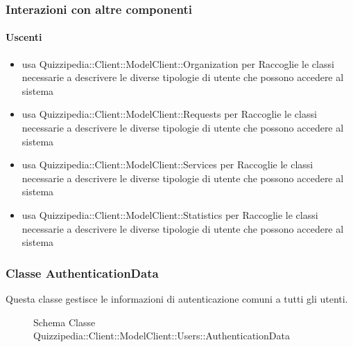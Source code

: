 \subsubsection{Interazioni con altre componenti}
\paragraph{Uscenti}
\begin{itemize}
\item usa Quizzipedia::Client::ModelClient::Organization per Raccoglie le classi necessarie a descrivere le diverse tipologie di utente che possono accedere al sistema
\item usa Quizzipedia::Client::ModelClient::Requests per Raccoglie le classi necessarie a descrivere le diverse tipologie di utente che possono accedere al sistema
\item usa Quizzipedia::Client::ModelClient::Services per Raccoglie le classi necessarie a descrivere le diverse tipologie di utente che possono accedere al sistema
\item usa Quizzipedia::Client::ModelClient::Statistics per Raccoglie le classi necessarie a descrivere le diverse tipologie di utente che possono accedere al sistema
\end{itemize}
\subsubsection{Classe AuthenticationData}
Questa classe gestisce le informazioni di autenticazione comuni a tutti gli utenti.
\begin{figure}[H]
\centering
\noindent{}
\caption[Schema Classe AuthenticationData]{Schema Classe Quizzipedia::Client::ModelClient::Users::AuthenticationData}
\end{figure}
